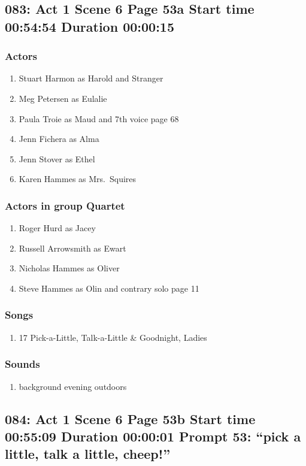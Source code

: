 \subsection{083: Act 1 Scene 6 Page 53a Start time 00:54:54 Duration 00:00:15}

\subsubsection{Actors}
\begin{enumerate}
\item Stuart Harmon as Harold and Stranger
\item Meg Petersen as Eulalie
\item Paula Troie as Maud and 7th voice page 68
\item Jenn Fichera as Alma
\item Jenn Stover as Ethel
\item Karen Hammes as Mrs.~Squires
\end{enumerate}
\subsubsection{Actors in group Quartet}
\begin{enumerate}
\item Roger Hurd as Jacey
\item Russell Arrowsmith as Ewart
\item Nicholas Hammes as Oliver
\item Steve Hammes as Olin and contrary solo page 11
\end{enumerate}

\subsubsection{Songs}
\begin{enumerate}
\item 17 Pick-a-Little, Talk-a-Little \& Goodnight, Ladies
\end{enumerate}\subsubsection{Sounds}
\begin{enumerate}
\item background evening outdoors
\end{enumerate}
\subsection{084: Act 1 Scene 6 Page 53b Start time 00:55:09 Duration 00:00:01 Prompt 53: ``pick a little, talk a little, cheep!''}
